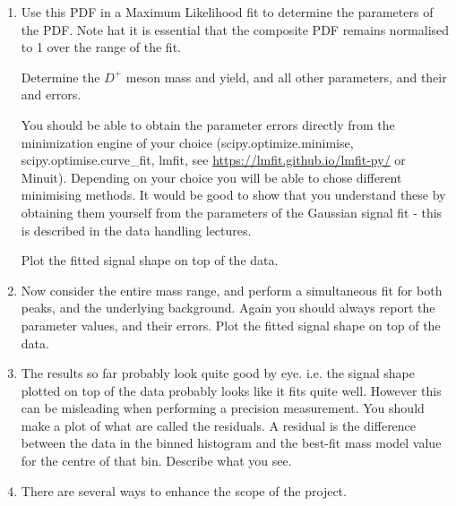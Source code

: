 \begin{enumerate}
\item	Use this PDF in a Maximum Likelihood fit to determine the parameters of the PDF. Note hat it is essential that the composite PDF remains normalised to 1 over the range of the fit.

Determine the $D^+$  meson mass and yield, and all other parameters, and their and errors.

You should be able to obtain the parameter errors directly from the minimization engine of your choice (scipy.optimize.minimise, scipy.optimise.curve\_fit, lmfit, see \url{https://lmfit.github.io/lmfit-py/} or Minuit). Depending on your choice you will be able to chose different minimising methods.
It would be good to show that you understand these by obtaining them yourself from the parameters of the Gaussian signal fit - this is described in the data handling lectures.

Plot the fitted signal shape on top of the data.

\item Now consider the entire mass range, and perform a simultaneous fit for both
peaks, and the underlying background. Again you should always report the parameter
values, and their errors. Plot the fitted signal shape on top of the data.
\item The results so far probably look quite good by eye. i.e. the signal shape plotted on
top of the data probably looks like it fits quite well. However this can be misleading
when performing a precision measurement. You should make a plot of what are called
the residuals. A residual is the difference between the data in the binned histogram
and the best-fit mass model value for the centre of that bin. Describe what you see.
\item There are several ways to enhance the scope of the project.


\end{enumerate}
